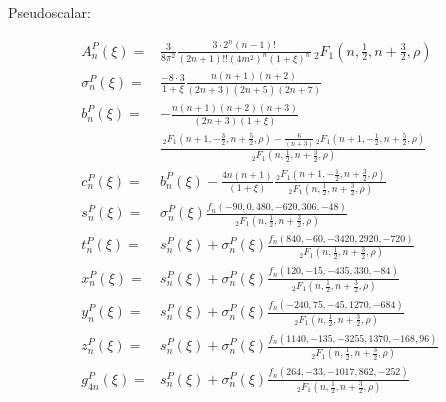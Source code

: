 \documentclass[aps,prc,superscriptaddress,showpacs,floatfix, nofootinbib,preprintnumbers,twocolumn]{revtex4}
\begin{document}
Pseudoscalar:
\begin{scriptsize}
\begin{align}
A^P_n(\xi)=&\frac{3}{8\pi^2}\frac{3\cdot 2^n(n-1)!}{(2n+1)!!(4m^2)^n(1+\xi)^n}\,_2F_1(n,\frac{1}{2},n+\frac{3}{2},\rho)\\
\sigma^P_n(\xi)=&\frac{-8\cdot 3}{1+\xi}\frac{n(n+1)(n+2)}{(2n+3)(2n+5)(2n+7)}\\
b^P_n(\xi)=&-\frac{n(n+1)(n+2)(n+3)}{(2n+3)(1+\xi)}\nonumber\\
&\frac{\,_2F_1(n+1,-\frac{3}{2},n+\frac{5}{2},\rho)-\frac{6}{(n+3)}\,_2F_1(n+1,-\frac{1}{2},n+\frac{5}{2},\rho)}{\,_2F_1(n,\frac{1}{2},n+\frac{3}{2},\rho)}\\
c^P_n(\xi)=&b^P_n(\xi)-\frac{4n(n+1)}{(1+\xi)}\frac{\,_2F_1(n+1,-\frac{1}{2},n+\frac{3}{2},\rho)}{\,_2F_1(n,\frac{1}{2},n+\frac{3}{2},\rho)}
\\
s^P_n(\xi)=&\sigma^P_n(\xi)\frac{f_n(-90,0,480,-620,306,-48)}{\,_2F_1(n,\frac{1}{2},n+\frac{3}{2},\rho)}\\
t^P_n(\xi)=&s^P_n(\xi)+\sigma^P_n(\xi)\frac{f_n(840,-60,-3420,2920,-720)}{\,_2F_1(n,\frac{1}{2},n+\frac{3}{2},\rho)}\\
x^P_n(\xi)=&s^P_n(\xi)+\sigma^P_n(\xi)\frac{f_n(120,-15,-435,330,-84)}{\,_2F_1(n,\frac{1}{2},n+\frac{3}{2},\rho)}\\
y^P_n(\xi)=&s^P_n(\xi)+\sigma^P_n(\xi)\frac{f_n(-240,75,-45,1270,-684)}{\,_2F_1(n,\frac{1}{2},n+\frac{3}{2},\rho)}\\
z^P_n(\xi)=&s^P_n(\xi)+\sigma^P_n(\xi)\frac{f_n(1140,-135,-3255,1370,-168,96)}{\,_2F_1(n,\frac{1}{2},n+\frac{3}{2},\rho)}\\
g^P_{4n}(\xi)=&s^P_n(\xi)+\sigma^P_n(\xi)\frac{f_n(264,-33,-1017,862,-252)}{\,_2F_1(n,\frac{1}{2},n+\frac{3}{2},\rho)}
\end{align}
\end{scriptsize}
\end{document}
